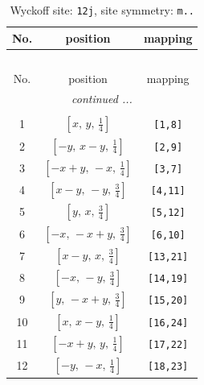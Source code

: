 \documentclass[fleqn,8pt]{jsarticle}
\begin{document}
\begin{longtable}{ccc}
\caption{Wyckoff site: {\tt 12j}, site symmetry: {\tt m..}}
 \\
 \hline \hline
No. & position & mapping \\ \hline \endfirsthead

\multicolumn{2}{l}{\tablename\ \thetable{}} \\
 \hline \hline
No. & position & mapping \\ \hline \endhead

 \hline \hline
\multicolumn{2}{r}{\footnotesize\it continued ...} \\ \endfoot

 \hline \hline
\multicolumn{2}{r}{} \\ \endlastfoot

1 & $\left[ x,\, y,\, \frac{1}{4} \right]$ & {\tt [1,8]} \\ \hline
2 & $\left[ - y,\, x - y,\, \frac{1}{4} \right]$ & {\tt [2,9]} \\ \hline
3 & $\left[ - x + y,\, - x,\, \frac{1}{4} \right]$ & {\tt [3,7]} \\ \hline
4 & $\left[ x - y,\, - y,\, \frac{3}{4} \right]$ & {\tt [4,11]} \\ \hline
5 & $\left[ y,\, x,\, \frac{3}{4} \right]$ & {\tt [5,12]} \\ \hline
6 & $\left[ - x,\, - x + y,\, \frac{3}{4} \right]$ & {\tt [6,10]} \\ \hline
7 & $\left[ x - y,\, x,\, \frac{3}{4} \right]$ & {\tt [13,21]} \\ \hline
8 & $\left[ - x,\, - y,\, \frac{3}{4} \right]$ & {\tt [14,19]} \\ \hline
9 & $\left[ y,\, - x + y,\, \frac{3}{4} \right]$ & {\tt [15,20]} \\ \hline
10 & $\left[ x,\, x - y,\, \frac{1}{4} \right]$ & {\tt [16,24]} \\ \hline
11 & $\left[ - x + y,\, y,\, \frac{1}{4} \right]$ & {\tt [17,22]} \\ \hline
12 & $\left[ - y,\, - x,\, \frac{1}{4} \right]$ & {\tt [18,23]} \\
\end{longtable}
\renewcommand{\arraystretch}{1.2}
\end{document}
